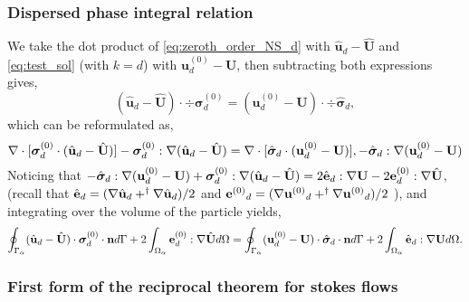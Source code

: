 \subsubsection{Dispersed phase integral relation}

We take the dot product of \ref{eq:zeroth_order_NS_d} with $\hat{\textbf{u}}_d - \hat{\textbf{U}}$ and \ref{eq:test_sol} (with $k=d$) with $\textbf{u}_d^{(0)} -\textbf{U}$, then subtracting both expressions gives, 
\begin{equation*}
    (\hat{\textbf{u}}_d - \hat{\textbf{U}})\cdot \div\bm\sigma_d^{(0)}
    =
    (\textbf{u}_d^{(0)} - \textbf{U}) \cdot \div \hat{\bm\sigma}_d, 
\end{equation*}
which can be reformulated as, 
\begin{equation*}
    \mathbf{\nabla}\cdot [\bm\sigma_d^{(0)} \cdot (\hat{\textbf{u}}_d - \hat{\textbf{U}})]
    - \bm\sigma_d^{(0)} : \mathbf{\nabla} (\hat{\textbf{u}}_d - \hat{\textbf{U}})
    =
    \mathbf{\nabla}\cdot [\hat{\bm\sigma}_d \cdot (\textbf{u}_d^{(0)} - \textbf{U})], 
    - \hat{\bm\sigma}_d : \mathbf{\nabla} ({\textbf{u}}_d^{(0)} - \textbf{U})
\end{equation*}
Noticing that $- \hat{\bm\sigma}_d : \mathbf{\nabla} ({\textbf{u}}_d^{(0)} - \textbf{U}) + \bm\sigma_d^{(0)} : \mathbf{\nabla} (\hat{\textbf{u}}_d - \hat{\textbf{U}}) = 2 \hat{\textbf{e}}_d : \mathbf{\nabla} \textbf{U} - 2 \textbf{e}_d^{(0)} : \mathbf{\nabla} \hat{\textbf{U}}$, 
(recall that $\hat{\textbf{e}}_d = (\mathbf{\nabla} \hat{\textbf{u}}_d + ^\dagger \mathbf{\nabla} \hat{\textbf{u}}_d)/2$ and ${\textbf{e}^{(0)}}_d = (\mathbf{\nabla} {\textbf{u}^{(0)}}_d + ^\dagger \mathbf{\nabla} {\textbf{u}^{(0)}}_d)/2$ ), and integrating over the volume of the particle yields, 
\begin{equation}
    \intS{(\hat{\textbf{u}}_d - \hat{\textbf{U}})\cdot \bm\sigma_d^{(0)} \cdot \textbf{n}}
    + 2\intO{\textbf{e}_d^{(0)} : \grad \hat{\textbf{U}}}
    =
    \intS{(\textbf{u}_d^{(0)} - \textbf{U}) \cdot  \hat{\bm\sigma}_d\cdot \textbf{n} }
    + 2\intO{\hat{\textbf{e}}_d : \grad \textbf{U}}. 
    \label{eq:reciprocal_d}
\end{equation}



\subsubsection{First form of the reciprocal theorem for stokes flows}

